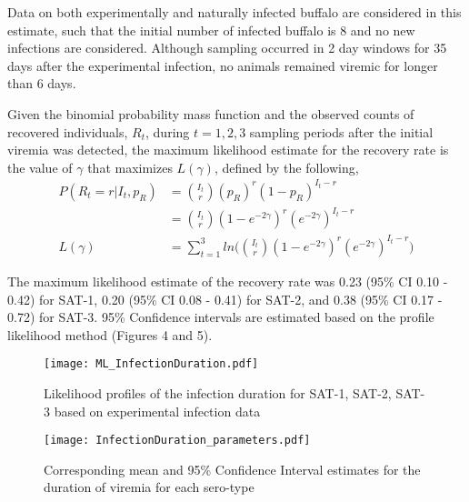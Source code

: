\documentclass[letterpaper,12pt]{article}
\begin{document}
Data on both experimentally and naturally infected buffalo are considered in this estimate, such that the initial number of infected buffalo is 8 and no new infections are considered.
Although sampling occurred in 2 day windows for 35 days after the experimental infection, no animals remained viremic for longer than 6 days.

Given the binomial probability mass function and the observed counts of recovered individuals, $R_{t}$, during $t=1, 2, 3$ sampling periods after the initial viremia was detected, the maximum likelihood estimate for the recovery rate is the value of $\gamma$ that maximizes $L(\gamma)$, defined by the following, 
\begin{align}
P(R_{t} = r | I_t, p_R) &= \binom{I_t}{r} (p_R)^{r} (1 - p_R)^{I_t-r}  \nonumber  \\
&=  \binom{I_t}{r} (1-e^{- 2 \gamma})^{r} (e^{- 2 \gamma})^{I_t-r} \nonumber \\
L(\gamma) &= \sum_{t=1}^{3} ln \Big(  \binom{I_t}{r} (1- e^{- 2 \gamma})^{r} (e^{- 2 \gamma})^{I_t-r}    \Big)
\end{align}

The maximum likelihood estimate of the recovery rate was 0.23 (95\% CI 0.10 - 0.42) for SAT-1,  0.20 (95\% CI 0.08 - 0.41) for SAT-2, and 0.38 (95\% CI 0.17 - 0.72) for SAT-3.  95\% Confidence intervals are estimated based on the profile likelihood method (Figures 4 and 5). \\

\begin{figure}[h]
\begin{center}
\texttt{[image: ML\_InfectionDuration.pdf]}
\caption{Likelihood profiles of the infection duration for SAT-1, SAT-2, SAT-3 based on experimental infection data}
\end{center}
\end{figure}

\begin{figure}[h]
\begin{center}
\texttt{[image: InfectionDuration\_parameters.pdf]}
\caption{Corresponding mean and 95\% Confidence Interval estimates for the duration of viremia for each sero-type}
\end{center}
\end{figure}

\clearpage



\clearpage


\end{document}
